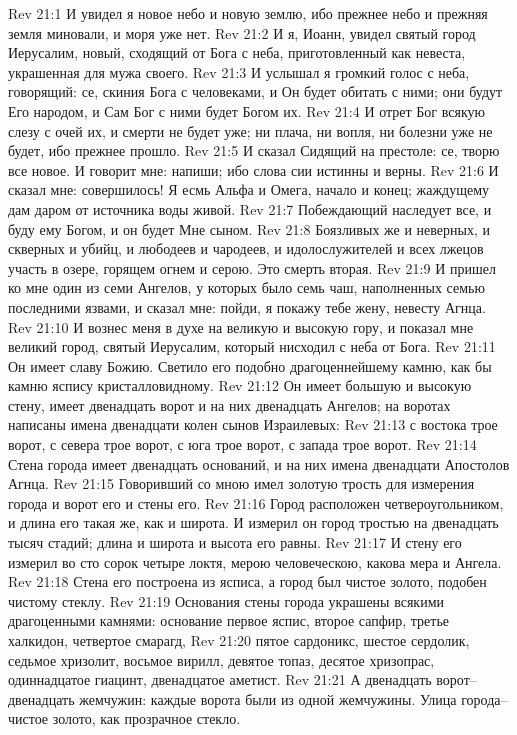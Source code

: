 Rev 21:1  И увидел я новое небо и новую землю, ибо прежнее небо и прежняя земля миновали, и моря уже нет.
Rev 21:2  И я, Иоанн, увидел святый город Иерусалим, новый, сходящий от Бога с неба, приготовленный как невеста, украшенная для мужа своего.
Rev 21:3  И услышал я громкий голос с неба, говорящий: се, скиния Бога с человеками, и Он будет обитать с ними; они будут Его народом, и Сам Бог с ними будет Богом их.
Rev 21:4  И отрет Бог всякую слезу с очей их, и смерти не будет уже; ни плача, ни вопля, ни болезни уже не будет, ибо прежнее прошло.
Rev 21:5  И сказал Сидящий на престоле: се, творю все новое. И говорит мне: напиши; ибо слова сии истинны и верны.
Rev 21:6  И сказал мне: совершилось! Я есмь Альфа и Омега, начало и конец; жаждущему дам даром от источника воды живой.
Rev 21:7  Побеждающий наследует все, и буду ему Богом, и он будет Мне сыном.
Rev 21:8  Боязливых же и неверных, и скверных и убийц, и любодеев и чародеев, и идолослужителей и всех лжецов участь в озере, горящем огнем и серою. Это смерть вторая.
Rev 21:9  И пришел ко мне один из семи Ангелов, у которых было семь чаш, наполненных семью последними язвами, и сказал мне: пойди, я покажу тебе жену, невесту Агнца.
Rev 21:10  И вознес меня в духе на великую и высокую гору, и показал мне великий город, святый Иерусалим, который нисходил с неба от Бога.
Rev 21:11  Он имеет славу Божию. Светило его подобно драгоценнейшему камню, как бы камню яспису кристалловидному.
Rev 21:12  Он имеет большую и высокую стену, имеет двенадцать ворот и на них двенадцать Ангелов; на воротах написаны имена двенадцати колен сынов Израилевых:
Rev 21:13  с востока трое ворот, с севера трое ворот, с юга трое ворот, с запада трое ворот.
Rev 21:14  Стена города имеет двенадцать оснований, и на них имена двенадцати Апостолов Агнца.
Rev 21:15  Говоривший со мною имел золотую трость для измерения города и ворот его и стены его.
Rev 21:16  Город расположен четвероугольником, и длина его такая же, как и широта. И измерил он город тростью на двенадцать тысяч стадий; длина и широта и высота его равны.
Rev 21:17  И стену его измерил во сто сорок четыре локтя, мерою человеческою, какова мера и Ангела.
Rev 21:18  Стена его построена из ясписа, а город был чистое золото, подобен чистому стеклу.
Rev 21:19  Основания стены города украшены всякими драгоценными камнями: основание первое яспис, второе сапфир, третье халкидон, четвертое смарагд,
Rev 21:20  пятое сардоникс, шестое сердолик, седьмое хризолит, восьмое вирилл, девятое топаз, десятое хризопрас, одиннадцатое гиацинт, двенадцатое аметист.
Rev 21:21  А двенадцать ворот--двенадцать жемчужин: каждые ворота были из одной жемчужины. Улица города--чистое золото, как прозрачное стекло.
